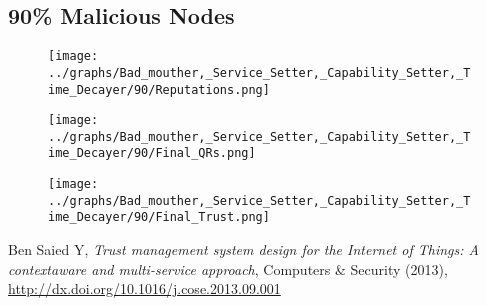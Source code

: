 \documentclass{article}
\begin{document}
    \begin{minipage}[t]{0.49\columnwidth}
    \subsection*{90\% Malicious Nodes}
        \begin{figure}[H]
            \centering
            \texttt{[image: ../graphs/Bad\_mouther,\_Service\_Setter,\_Capability\_Setter,\_Time\_Decayer/90/Reputations.png]}
        \end{figure}
        \begin{figure}[H]
            \centering
            \texttt{[image: ../graphs/Bad\_mouther,\_Service\_Setter,\_Capability\_Setter,\_Time\_Decayer/90/Final\_QRs.png]}
        \end{figure}
    \end{minipage}
    \begin{minipage}[t]{0.49\columnwidth}
        \begin{figure}[H]
            \centering
            \texttt{[image: ../graphs/Bad\_mouther,\_Service\_Setter,\_Capability\_Setter,\_Time\_Decayer/90/Final\_Trust.png]}
        \end{figure}
    \end{minipage}
    \newpage

    \begin{thebibliography}{9}
            Ben Saied Y,
            \textit{Trust management system design for the Internet of Things: A contextaware and multi-service approach},
            Computers \& Security (2013),
            \url{http://dx.doi.org/10.1016/j.cose.2013.09.001}
    \end{thebibliography}
\end{document}
